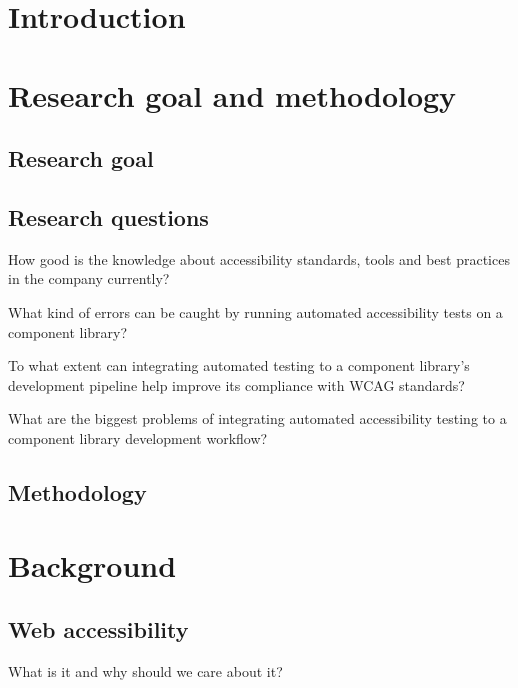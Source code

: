 \documentclass{master_thesis}
\begin{document}
\tableofcontents

\section*{Introduction}

\section{Research goal and methodology}
	\subsection{Research goal}
	\subsection{Research questions}

	\begin{RQlist}
		\item How good is the knowledge about accessibility standards, tools and best practices in the company currently?
		\item What kind of errors can be caught by running automated accessibility tests on a component library?
		\item To what extent can integrating automated testing to a component library's development pipeline help improve its compliance with WCAG standards?
		\item What are the biggest problems of integrating automated accessibility testing to a component library development workflow?
	\end{RQlist}
	\subsection{Methodology}

\section{Background}
	\subsection{Web accessibility}
	What is it and why should we care about it?
\end{document}
